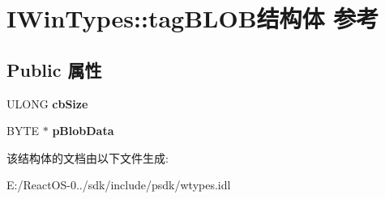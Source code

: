 \hypertarget{struct_i_win_types_1_1tag_b_l_o_b}{}\section{I\+Win\+Types\+:\+:tag\+B\+L\+O\+B结构体 参考}
\label{struct_i_win_types_1_1tag_b_l_o_b}
\subsection*{Public 属性}
\begin{DoxyCompactItemize}
\item 
\mbox{\label{struct_i_win_types_1_1tag_b_l_o_b_ab950bfb7d68fdf5ec97812b9c690e1c3}} 
U\+L\+O\+NG {\bfseries cb\+Size}
\item 
\mbox{\label{struct_i_win_types_1_1tag_b_l_o_b_a2ef21b4c5c1c02acf891216b8aa1c1eb}} 
B\+Y\+TE $\ast$ {\bfseries p\+Blob\+Data}
\end{DoxyCompactItemize}


该结构体的文档由以下文件生成\+:\begin{DoxyCompactItemize}
\item 
E\+:/\+React\+O\+S-\/0../sdk/include/psdk/wtypes.\+idl\end{DoxyCompactItemize}
